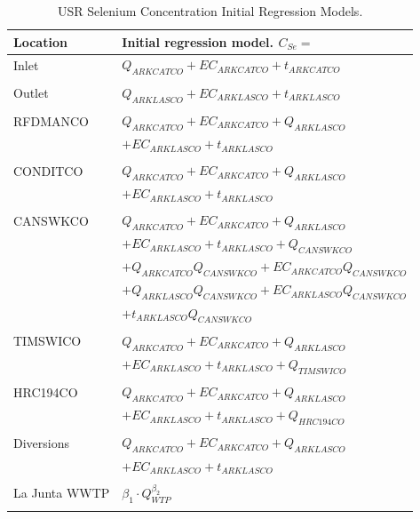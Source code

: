 \begin{linenumbers}
\begin{table}[htbp]
\centering
\caption{USR Selenium Concentration Initial Regression Models.}
\label{tab:USRInitialRegression}
\begin{tabular}{ll}
	\toprule
	Location		& Initial regression model. $C_{Se}=$\\
	\midrule
	\midrule
	Inlet		& $Q_{ARKCATCO} + EC_{ARKCATCO} + t_{ARKCATCO}$\\
	\\
	Outlet		& $Q_{ARKLASCO} + EC_{ARKLASCO} + t_{ARKLASCO}$\\
	\\	
	RFDMANCO		& $Q_{ARKCATCO} + EC_{ARKCATCO} + Q_{ARKLASCO}$\\
					& $+ EC_{ARKLASCO} + t_{ARKLASCO}$\\
	\\
	CONDITCO		& $Q_{ARKCATCO} + EC_{ARKCATCO} + Q_{ARKLASCO}$\\
					& $+ EC_{ARKLASCO} + t_{ARKLASCO}$\\
	\\	
	CANSWKCO		& $Q_{ARKCATCO} + EC_{ARKCATCO} + Q_{ARKLASCO}$\\ 
					& $+ EC_{ARKLASCO} + t_{ARKLASCO} + Q_{CANSWKCO}$\\
					& $+ Q_{ARKCATCO}Q_{CANSWKCO} + EC_{ARKCATCO}Q_{CANSWKCO}$\\
					& $+ Q_{ARKLASCO}Q_{CANSWKCO} + EC_{ARKLASCO}Q_{CANSWKCO}$\\
					& $+ t_{ARKLASCO}Q_{CANSWKCO}$\\
	\\
	TIMSWICO		& $Q_{ARKCATCO} + EC_{ARKCATCO} + Q_{ARKLASCO}$\\
					& $+ EC_{ARKLASCO} + t_{ARKLASCO} + Q_{TIMSWICO}$\\
	\\
	HRC194CO		& $Q_{ARKCATCO} + EC_{ARKCATCO} + Q_{ARKLASCO}$\\
					& $+ EC_{ARKLASCO} + t_{ARKLASCO} + Q_{HRC194CO}$\\
	\\	
	Diversions		& $Q_{ARKCATCO} + EC_{ARKCATCO} + Q_{ARKLASCO}$\\
					& $+ EC_{ARKLASCO} + t_{ARKLASCO}$\\
	\\	
	La Junta WWTP	& $\beta_{1} \cdot Q_{WTP}^{\beta_{2}}$\\
	\bottomrule \\
\end{tabular}
\end{table}


\end{linenumbers}
